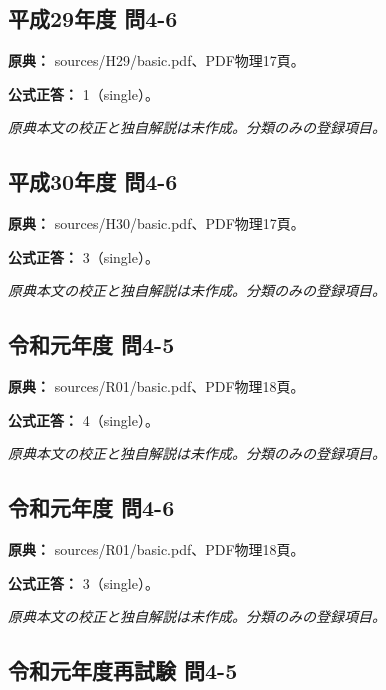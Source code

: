 \subsection{平成29年度 問4-6}
\label{q:h29-reg-basic-4-6}

\noindent\textbf{原典：} sources/H29/basic.pdf、PDF物理17頁。

\textbf{公式正答：} 1（single）。

\par\textit{原典本文の校正と独自解説は未作成。分類のみの登録項目。}

\subsection{平成30年度 問4-6}
\label{q:h30-reg-basic-4-6}

\noindent\textbf{原典：} sources/H30/basic.pdf、PDF物理17頁。

\textbf{公式正答：} 3（single）。

\par\textit{原典本文の校正と独自解説は未作成。分類のみの登録項目。}

\subsection{令和元年度 問4-5}
\label{q:r01-reg-basic-4-5}

\noindent\textbf{原典：} sources/R01/basic.pdf、PDF物理18頁。

\textbf{公式正答：} 4（single）。

\par\textit{原典本文の校正と独自解説は未作成。分類のみの登録項目。}

\subsection{令和元年度 問4-6}
\label{q:r01-reg-basic-4-6}

\noindent\textbf{原典：} sources/R01/basic.pdf、PDF物理18頁。

\textbf{公式正答：} 3（single）。

\par\textit{原典本文の校正と独自解説は未作成。分類のみの登録項目。}

\subsection{令和元年度再試験 問4-5}
\label{q:r01-ret-basic-4-5}

